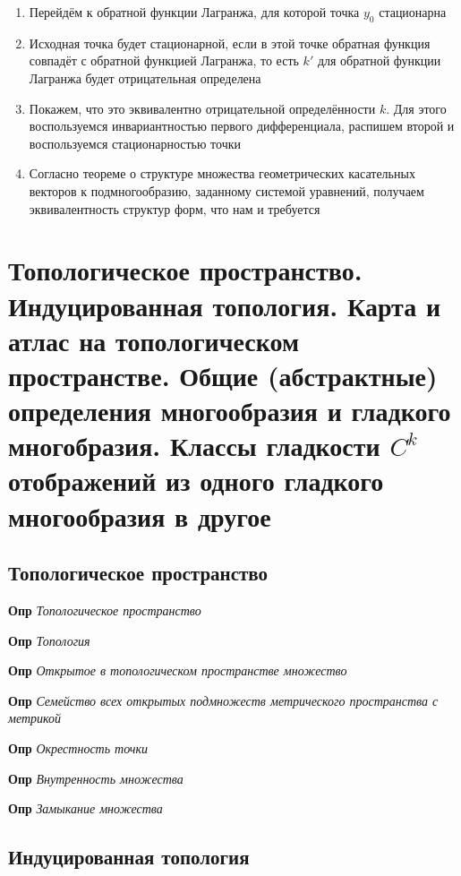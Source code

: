 \documentclass[a4paper, 14pt]{article}
\begin{document}
    \begin{enumerate}
        \item Перейдём к обратной функции Лагранжа, для которой точка $y_0$ стационарна
        \item Исходная точка будет стационарной, если в этой точке обратная функция совпадёт с обратной функцией
        Лагранжа, то есть $k'$ для обратной функции Лагранжа будет отрицательная определена
        \item Покажем, что это эквивалентно отрицательной определённости $k$.
        Для этого воспользуемся инвариантностью первого дифференциала, распишем второй и воспользуемся
        стационарностью точки
        \item Согласно теореме о структуре множества геометрических касательных векторов к подмногообразию, заданному
        системой уравнений, получаем эквивалентность структур форм, что нам и требуется
    \end{enumerate}
    
    \section{Топологическое пространство.
    Индуцированная топология.
    Карта и атлас на топологическом пространстве.
    Общие (абстрактные) определения многообразия и гладкого многобразия.
    Классы гладкости $C^k$ отображений из одного гладкого многообразия в другое}
    
    \subsection{Топологическое пространство}
    
    \textbf{Опр} \textit{Топологическое пространство}
    
    \textbf{Опр} \textit{Топология}
    
    \textbf{Опр} \textit{Открытое в топологическом пространстве множество}
    
    \textbf{Опр} \textit{Семейство всех открытых подмножеств метрического пространства с метрикой}
    
    \textbf{Опр} \textit{Окрестность точки}
    
    \textbf{Опр} \textit{Внутренность множества}
    
    \textbf{Опр} \textit{Замыкание множества}
    
    \subsection{Индуцированная топология}
    
\end{document}
